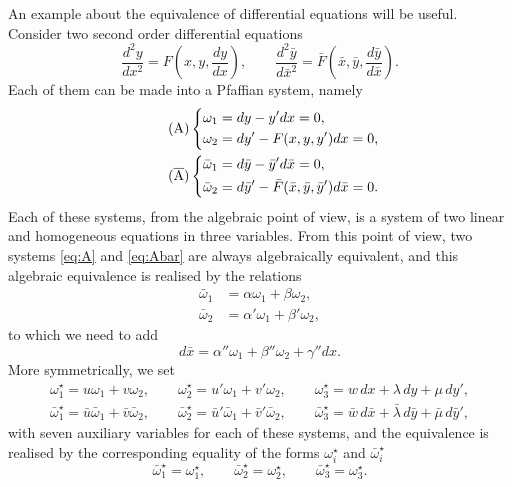 \documentclass[leqno,11pt]{article}
\theoremstyle{shape1}
\theoremstyle{shape0}
\theoremstyle{shape2}
\theoremstyle{definition}
\begin{document}
An example about the equivalence of differential equations will be useful. Consider two second order differential equations
\begin{equation}
  \label{eq:3}
  \frac{d^{2}y}{dx^{2}}=F\left(x,y,\frac{dy}{dx}\right),\qquad\frac{d^{2}\bar y}{d\bar x^{2}}=\bar F\left(\bar x,\bar y,\frac{d\bar y}{d\bar x}\right).
\end{equation}
Each of them can be made into a Pfaffian system, namely
\begin{align}
\label{eq:A}\tag{A}
\left\{
  \begin{aligned}
    \omega_{1}&=dy-y'dx=0,\\
    \omega_{2}&=dy'-F(x,y,y')dx=0,
  \end{aligned}
\right.
\\
\label{eq:Abar}\tag{$\overline{\mathrm A}$}
\left\{
  \begin{aligned}
    \bar\omega_{1}&=d\bar y-\bar y'd\bar x=0,\\
    \bar\omega_{2}&=d\bar y'-\bar F(\bar x,\bar y,\bar y')d\bar x=0.
  \end{aligned}
\right.
\end{align}
Each of these systems, from the algebraic point of view, is a system of two linear and homogeneous equations in three variables. From this point of view, two systems \eqref{eq:A} and \eqref{eq:Abar} are always algebraically equivalent, and this algebraic equivalence is realised by the relations
\begin{align*}
  \bar\omega_{1}&=\alpha\omega_{1}+\beta\omega_{2},\\
  \bar\omega_{2}&=\alpha'\omega_{1}+\beta'\omega_{2},
\end{align*}
to which we need to add
\[
d\bar x=\alpha''\omega_{1}+\beta''\omega_{2}+\gamma''dx.
\]
More symmetrically, we set
\begin{gather*}
  \omega_{1}^{\star}=u\omega_{1}+v\omega_{2},\qquad\omega_{2}^{\star}=u'\omega_{1}+v'\omega_{2},\qquad\omega_{3}^{\star}=w\,dx+\lambda\,dy+\mu\,dy',\\
  \bar\omega_{1}^{\star}=\bar u\bar\omega_{1}+\bar v\bar\omega_{2},\qquad\bar\omega_{2}^{\star}=\bar u'\bar\omega_{1}+\bar v'\bar\omega_{2},\qquad\bar\omega_{3}^{\star}=\bar w\,d\bar x+\bar\lambda\,d\bar y+\bar\mu\,d\bar y',
\end{gather*}
with seven auxiliary variables for each of these systems, and the equivalence is realised by the corresponding equality of the forms $\omega_{i}^{\star}$ and $\bar\omega_{i}^{\star}$
\begin{equation}
  \label{eq:4}
  \bar\omega_{1}^{\star}=\omega_{1}^{\star},\qquad
  \bar\omega_{2}^{\star}=\omega_{2}^{\star},\qquad
  \bar\omega_{3}^{\star}=\omega_{3}^{\star}.
\end{equation}
\end{document}
